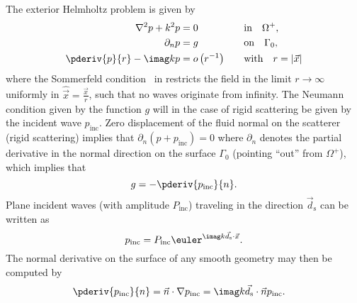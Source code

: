 The exterior Helmholtz problem is given by
\begin{alignat}{3}
	\nabla^2 p + k^2 p &= 0 	&&\text{in}\quad \Omega^+,\label{Eq2:HelmholtzEqn}\\
	\partial_n p &= g						&&\text{on}\quad \Gamma_0,\label{Eq2:HelmholtzEqnNeumannCond}\\
	\pderiv{p}{r}-\imag k p &= o\left(r^{-1}\right)\quad &&\text{with}\quad r=|\vec{x}|\label{Eq2:sommerfeldCond}
\end{alignat}
where the Sommerfeld condition~\cite{Sommerfeld1949pde} in  restricts the field in the limit $r\to\infty$ uniformly in $\hat{\vec{x}}=\frac{\vec{x}}{r}$, such that no waves originate from infinity. The Neumann condition given by the function $g$ will in the case of rigid scattering be given by the incident wave $p_{\mathrm{inc}}$. Zero displacement of the fluid normal on the scatterer (rigid scattering) implies that $\partial_n(p+p_{\mathrm{inc}}) = 0$ where $\partial_n$ denotes the partial derivative in the normal direction on the surface $\Gamma_0$ (pointing ``out'' from $\Omega^+$), which implies that
\begin{equation}
	g = -\pderiv{p_{\mathrm{inc}}}{n}.
\end{equation}
Plane incident waves (with amplitude $P_{\mathrm{inc}}$) traveling in the direction $\vec{d}_{\mathrm{s}}$ can be written as
\begin{equation}\label{Eq2:p_inc}
	p_{\mathrm{inc}} = P_{\mathrm{inc}}\euler^{\imag k\vec{d}_{\mathrm{s}}\cdot\vec{x}}.
\end{equation}
The normal derivative on the surface of any smooth geometry may then be computed by
\begin{align}
	\pderiv{p_{\mathrm{inc}}}{n} &= \vec{n}\cdot\nabla p_{\mathrm{inc}} = \imag k\vec{d}_{\mathrm{s}}\cdot\vec{n} p_{\mathrm{inc}}.
\end{align}

